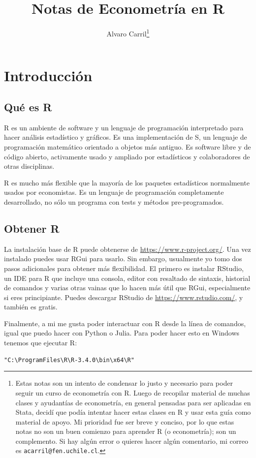 \documentclass{article}\usepackage[]{graphicx}\usepackage[]{color}
\title{Notas de Econometría en R}
\author{Alvaro Carril\thanks{Estas notas son un intento de condensar lo justo y necesario para poder seguir un curso de econometría con R.
Luego de recopilar material de muchas clases y ayudantías de econometría, en general pensadas para ser aplicadas en Stata, decidí que podía intentar hacer estas clases en R y usar esta guía como material de apoyo.
Mi prioridad fue ser breve y conciso, por lo que estas notas no son un buen comienzo para aprender R (o econometría); son un complemento.
Si hay algún error o quieres hacer algún comentario, mi correo es \texttt{acarril@fen.uchile.cl}.}}
\makeatletter
\newcommand{\hlstr}[1]{\textcolor[rgb]{0.192,0.494,0.8}{#1}}%
\newenvironment{kframe}{%
 \def\at@end@of@kframe{}%
 \ifinner\ifhmode%
  \def\at@end@of@kframe{\end{minipage}}%
  \begin{minipage}{\columnwidth}%
 \fi\fi%
 \def\FrameCommand##1{\hskip\@totalleftmargin \hskip-\fboxsep
 \colorbox{shadecolor}{##1}\hskip-\fboxsep
     \hskip-\linewidth \hskip-\@totalleftmargin \hskip\columnwidth}%
 \MakeFramed {\advance\hsize-\width
   \@totalleftmargin\z@ \linewidth\hsize
   \@setminipage}}%
 {\par\unskip\endMakeFramed%
 \at@end@of@kframe}
\newenvironment{knitrout}{}{} %
\makeatother
\begin{document}
\maketitle
\tableofcontents

\clearpage

\section{Introducción}

\subsection{Qué es R}

R es un ambiente de software y un lenguaje de programación interpretado para hacer análisis estadístico y gráficos. Es una implementación de S, un lenguaje de programación matemático orientado a objetos más antiguo. Es software libre y de código abierto, activamente usado y ampliado por estadísticos y colaboradores de otras disciplinas.

R es mucho más flexible que la mayoría de los paquetes estadísticos normalmente usados por economistas. Es un lenguaje de programación completamente desarrollado, no sólo un programa con tests y métodos pre-programados.


\subsection{Obtener R}

La instalación base de R puede obtenerse de \url{https://www.r-project.org/}. Una vez instalado puedes usar RGui para usarlo. Sin embargo, usualmente yo tomo dos pasos adicionales para obtener más flexibilidad. El primero es instalar RStudio, un IDE para R que incluye una consola, editor con resaltado de sintaxis, historial de comandos y varias otras vainas que lo hacen más útil que RGui, especialmente si eres principiante. Puedes descargar RStudio de \url{https://www.rstudio.com/}, y también es gratis.

Finalmente, a mi me gusta poder interactuar con R desde la línea de comandos, igual que puedo hacer con Python o Julia. Para poder hacer esto en Windows tenemos que ejecutar R:

\begin{knitrout}
\color{fgcolor}\begin{kframe}
\begin{alltt}
\hlstr{"C:\textbackslash{}Program Files\textbackslash{}R\textbackslash{}R-3.4.0\textbackslash{}bin\textbackslash{}x64\textbackslash{}R"}
\end{alltt}
\end{kframe}
\end{knitrout}
\end{document}
